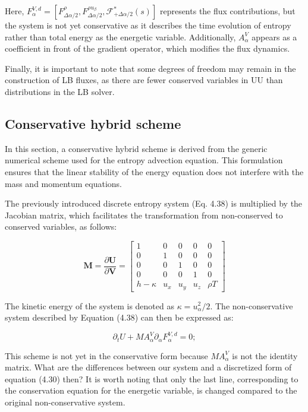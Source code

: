 Here, $F_\alpha^{V,d} = [F_{\Delta\alpha/2}^{\rho} , F_{\Delta\alpha/2}^{\rho
u_\beta}, \mathcal{F}^*_{+\Delta\alpha/2}(s)]$ represents the flux
contributions, but the system is not yet conservative as it describes the time
evolution of entropy rather than total energy as the energetic variable.
Additionally, $A_\alpha^V$ appears as a coefficient in front of the gradient
operator, which modifies the flux dynamics.

Finally, it is important to note that some degrees of freedom may remain in the
construction of LB fluxes, as there are fewer conserved variables in UU than
distributions in the LB solver.

\subsection {Conservative hybrid scheme}

In this section, a conservative hybrid scheme is derived from the generic
numerical scheme used for the entropy advection equation. This formulation
ensures that the linear stability of the energy equation does not interfere with
the mass and momentum equations.

The previously introduced discrete entropy system (Eq. 4.38) is multiplied by
the Jacobian matrix, which facilitates the transformation from non-conserved to
conserved variables, as follows:

\[
\mathbf{M} = \frac{\partial \mathbf{U}}{\partial \mathbf{V}} =
\begin{bmatrix}
1 & 0 & 0 & 0 & 0 \\
0 & 1 & 0 & 0 & 0 \\
0 & 0 & 1 & 0 & 0 \\
0 & 0 & 0 & 1 & 0 \\
h - \kappa & u_x & u_y & u_z & \rho T
\end{bmatrix}
\]

The kinetic energy of the system is denoted as $\kappa=u_\alpha^2/2$. The
non-conservative system described by Equation (4.38) can then be expressed as:

\begin{equation}
	\partial_t U + MA_\alpha^V\partial_\alpha F_\alpha^{V,d} = 0;
\end{equation}

This scheme is not yet in the conservative form because \( MA_\alpha^V \) is not
the identity matrix. What are the differences between our system and a
discretized form of equation (4.30) then? It is worth noting that only the last
line, corresponding to the conservation equation for the energetic variable, is
changed compared to the original non-conservative system. 

